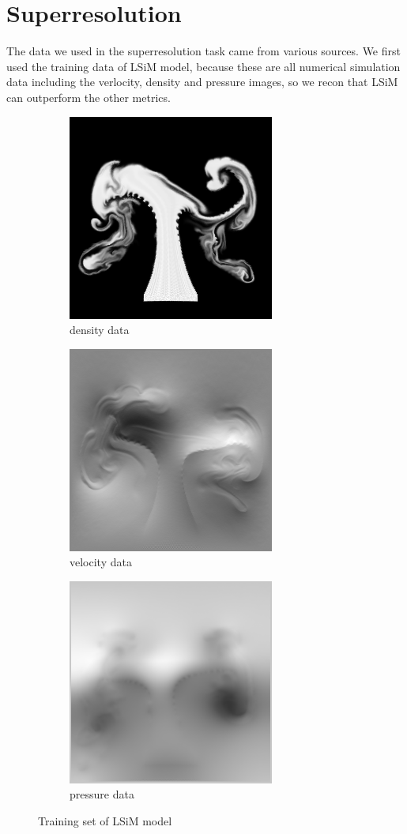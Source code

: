 \documentclass[a4paper,12pt,twoside]{report}
\begin{document}
\section{Superresolution}
The data we used in the superresolution task came from various sources. We first used the training data of LSiM model, because these are all numerical simulation data including the verlocity, density and pressure images, so we recon that LSiM can outperform the other metrics.
\begin{figure}
\centering
\begin{subfigure}{0.3\textwidth}
  \centering
  \includegraphics[scale=0.5]{density.png}
  \caption{density data}
\end{subfigure}
\begin{subfigure}{0.3\textwidth}
  \centering
  \includegraphics[scale=0.5]{velocity.png}
  \caption{velocity data}
\end{subfigure}
\begin{subfigure}{0.3\textwidth}
  \centering
  \includegraphics[scale=0.5]{pressure.png}
  \caption{pressure data}
\end{subfigure}
\caption{Training set of LSiM model}
\end{figure}
\end{document}
